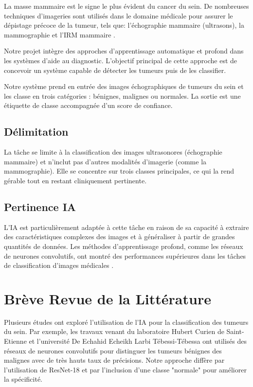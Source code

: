 \documentclass[a4paper,12pt]{article}
\begin{document}
La masse mammaire est le signe le plus évident du cancer du sein. De nombreuses techniques d'imageries sont utilisés dans le domaine médicale pour assurer le dépistage précoce de la tumeur, tels que: l'échographie mammaire (ultrasons), la mammographie et l'IRM mammaire \cite{soltani2025detection}.

Notre projet intègre des approches d'apprentissage automatique et profond dans les systèmes d'aide au diagnostic. L'objectif principal de cette approche est de concevoir un système capable de détecter les tumeurs puis de les classifier.

Notre système prend en entrée des images échographiques de tumeurs du sein et les classe en trois catégories : bénignes, malignes ou normales. La sortie est une étiquette de classe accompagnée d'un score de confiance.

\subsection{Délimitation}
La tâche se limite à la classification des images ultrasonores (échographie mammaire) et n'inclut pas d'autres modalités d'imagerie (comme la mammographie). Elle se concentre sur trois classes principales, ce qui la rend gérable tout en restant cliniquement pertinente.

\subsection{Pertinence IA}
L'IA est particulièrement adaptée à cette tâche en raison de sa capacité à extraire des caractéristiques complexes des images et à généraliser à partir de grandes quantités de données. Les méthodes d'apprentissage profond, comme les réseaux de neurones convolutifs, ont montré des performances supérieures dans les tâches de classification d'images médicales \cite{mayouf2021preparation}.

\section{Brève Revue de la Littérature}

Plusieurs études ont exploré l'utilisation de l'IA pour la classification des tumeurs du sein. Par exemple, les travaux venant du laboratoire Hubert Curien de Saint-Etienne\cite{mayouf2021preparation} et l'université De Echahid Echeikh Larbi Tébessi-Tébessa \cite{soltani2025detection} ont utilisés des réseaux de neurones convolutifs pour distinguer les tumeurs bénignes des malignes avec de très hauts taux de précisions. Notre approche diffère par l'utilisation de ResNet-18 et par l'inclusion d'une classe "normale" pour améliorer la spécificité.
\end{document}
